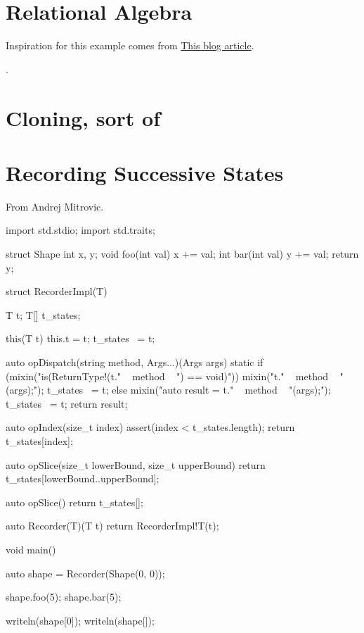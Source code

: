 \section{Relational Algebra}

Inspiration for this example comes from \href{http://david.rothlis.net/d/templates}{This blog article}.

.

\section{Cloning, sort of}


\section{Recording Successive States}

From Andrej Mitrovic.

\begin{dcode}
import std.stdio;
import std.traits;

struct Shape
{
    int x, y;
    void foo(int val) { x += val; }
    int bar(int val) { y += val; return y; }
}

struct RecorderImpl(T)
{
    T t;
    T[] t_states;
    
    this(T t)
    {
        this.t = t;
        t_states ~= t;
    }
    
    auto opDispatch(string method, Args...)(Args args)
    {
        static if (mixin("is(ReturnType!(t." ~ method ~ ") == void)"))
        {
            mixin("t." ~ method ~ "(args);");
            t_states ~= t;
        }
        else
        {
            mixin("auto result = t." ~ method ~ "(args);");
            t_states ~= t;
            return result;
        }
    }
    
    auto opIndex(size_t index)
    {
        assert(index < t_states.length);
        return t_states[index];
    }
    
    auto opSlice(size_t lowerBound, size_t upperBound)
    {
        return t_states[lowerBound..upperBound];
    }
    
    auto opSlice()
    {
        return t_states[];
    }
}

auto Recorder(T)(T t)
{
    return RecorderImpl!T(t);
}

void main()
{
    auto shape = Recorder(Shape(0, 0));
    
    shape.foo(5);
    shape.bar(5);
    
    writeln(shape[0]);
    writeln(shape[]);
}
\end{dcode}



